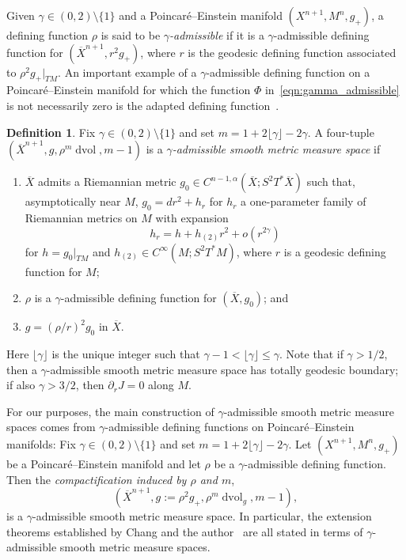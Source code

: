 \documentclass{amsart}
\theoremstyle{definition}
\newtheorem{defn}[thm]{Definition}
\theoremstyle{remark}
\numberwithin{equation}{section}
\begin{document}
Given $\gamma\in(0,2)\setminus\{1\}$ and a Poincar\'e--Einstein manifold $(X^{n+1},M^n,g_+)$, a defining function $\rho$ is said to be \emph{$\gamma$-admissible} if it is a $\gamma$-admissible defining function for $({\overline{X}}^{n+1},r^2g_+)$, where $r$ is the geodesic defining function associated to $\rho^2g_+{\rvert}_{TM}$.  An important example of a $\gamma$-admissible defining function on a Poincar\'e--Einstein manifold for which the function $\Phi$ in~\eqref{eqn:gamma_admissible} is not necessarily zero is the adapted defining function~\cite[Subsection~6.1]{CaseChang2013}.

\begin{defn}
 \label{defn:gamma_admissible_smms}
 Fix $\gamma\in(0,2)\setminus\{1\}$ and set $m=1+2\lfloor\gamma\rfloor-2\gamma$.  A four-tuple $({\overline{X}}^{n+1},g,\rho^m\operatorname{dvol},m-1)$ is a \emph{$\gamma$-admissible smooth metric measure space} if
 \begin{enumerate}
  \item ${\overline{X}}$ admits a Riemannian metric $g_0\in C^{n-1,\alpha}({\overline{X}};S^2T^\ast{\overline{X}})$ such that, asymptotically near $M$, $g_0=dr^2+h_r$ for $h_r$ a one-parameter family of Riemannian metrics on $M$ with expansion
  \[ h_r = h + h_{(2)}r^2 + o(r^{2\gamma}) \]
  for $h=g_0{\rvert}_{TM}$ and $h_{(2)}\in C^\infty(M;S^2T^\ast M)$, where $r$ is a geodesic defining function for $M$;
  \item $\rho$ is a $\gamma$-admissible defining function for $({\overline{X}},g_0)$; and
  \item $g=(\rho/r)^2g_0$ in ${\overline{X}}$.
 \end{enumerate}
\end{defn}

Here $\lfloor\gamma\rfloor$ is the unique integer such that $\gamma-1<\lfloor\gamma\rfloor\leq\gamma$.  Note that if $\gamma>1/2$, then a $\gamma$-admissible smooth metric measure space has totally geodesic boundary; if also $\gamma>3/2$, then $\partial_rJ=0$ along $M$.

For our purposes, the main construction of $\gamma$-admissible smooth metric measure spaces comes from $\gamma$-admissible defining functions on Poincar\'e--Einstein manifolds: Fix $\gamma\in(0,2)\setminus\{1\}$ and set $m=1+2\lfloor\gamma\rfloor-2\gamma$.  Let $(X^{n+1},M^n,g_+)$ be a Poincar\'e--Einstein manifold and let $\rho$ be a $\gamma$-admissible defining function.  Then the \emph{compactification induced by $\rho$ and $m$},
\[ \left({\overline{X}}^{n+1}, g:=\rho^2g_+, \rho^m\operatorname{dvol}_g, m-1\right), \]
is a $\gamma$-admissible smooth metric measure space.  In particular, the extension theorems established by Chang and the author~\cite[Theorem~4.1 and Theorem~4.4]{CaseChang2013} are all stated in terms of $\gamma$-admissible smooth metric measure spaces.
\end{document}
